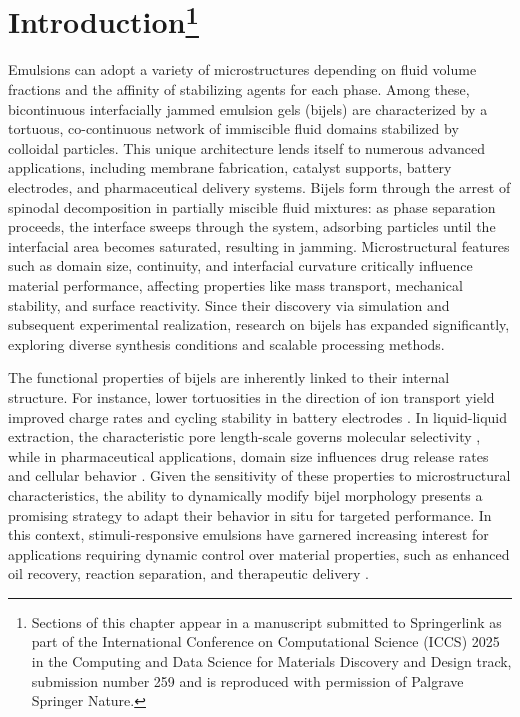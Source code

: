 \section[Introduction]{Introduction\protect\footnote{Sections of this chapter appear in a manuscript submitted to Springerlink as part of the International Conference on Computational 
Science (ICCS) 2025 in the Computing and Data Science for Materials Discovery and Design track, submission number 259 and is
reproduced with permission of Palgrave Springer Nature.}}


Emulsions can adopt a variety of microstructures depending on fluid volume fractions and the affinity of stabilizing agents for each phase. Among these, bicontinuous 
interfacially jammed emulsion gels (bijels) are characterized by a tortuous, co-continuous network of immiscible fluid domains stabilized by colloidal particles. This 
unique architecture lends itself to numerous advanced applications, including membrane fabrication, catalyst supports, battery electrodes, and pharmaceutical delivery 
systems. Bijels form through the arrest of spinodal decomposition in partially miscible fluid mixtures: as phase separation proceeds, the interface sweeps through the 
system, adsorbing particles until the interfacial area becomes saturated, resulting in jamming. Microstructural features such as domain size, continuity, and interfacial 
curvature critically influence material performance, affecting properties like mass transport, mechanical stability, and surface reactivity. Since their discovery via 
simulation and subsequent experimental realization, research on bijels has expanded significantly, exploring diverse synthesis conditions and scalable processing methods.

The functional properties of bijels are inherently linked to their internal structure. For instance, lower tortuosities in the direction of ion transport yield improved charge 
rates and cycling stability in battery electrodes \cite{ebner_tortuosity_2014, samdani_bicontinuous_2017}. In liquid-liquid extraction, the characteristic pore length-scale governs 
molecular selectivity \cite{khan_nanostructured_2022}, while in pharmaceutical applications, domain size influences drug release rates and cellular behavior 
\cite{vanoli_bijels_2022, thorson_bijel-templated_2019}. Given the sensitivity of these properties to microstructural characteristics, the ability to dynamically modify bijel 
morphology presents a promising strategy to adapt their behavior in situ for targeted performance. In this context, stimuli-responsive emulsions have garnered increasing interest 
for applications requiring dynamic control over material properties, such as enhanced oil recovery, reaction separation, and therapeutic delivery 
\cite{tham_magnetophoresis_2021, cui_stabilizing_2013, rozynek_opening_2019, lu_controllable_2020}. 

